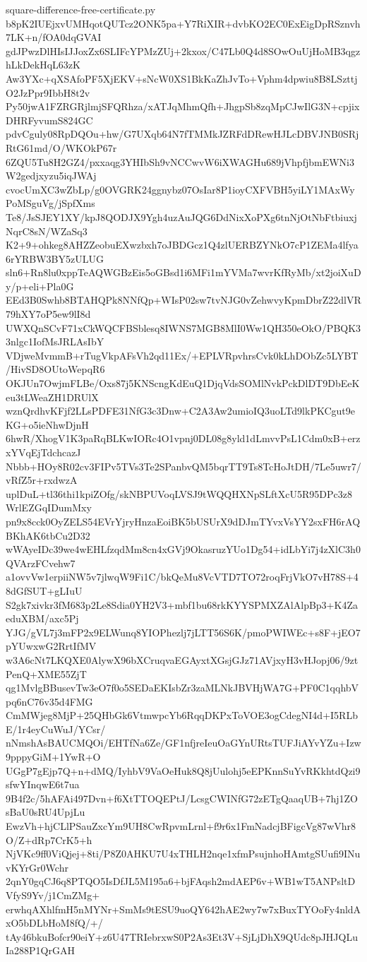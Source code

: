 \documentclass[11pt]{article}
\theoremstyle{definition}
\theoremstyle{remark}
\begin{document}
\begin{filecontents*}[overwrite]{square-difference-free-certificate.py}
b8pK2IUEjxvUMHqotQUTcz2ONK5pa+Y7RiXIR+dvbKO2EC0ExEigDpRSznvh7LK+n/fOA0dqGVAI
gdJPwzDlHIsIJJoxZx6SLIFcYPMzZUj+2kxox/C47Lb0Q4d8SOwOuUjHoMB3qgzhLkDekHqL63zK
Aw3YXc+qXSAfoPF5XjEKV+sNcW0XS1BkKaZhJvTo+Vphm4dpwiu8B8LSzttjO2JzPpr9IbbH8t2v
Py50jwA1FZRGRjlmjSFQRhza/xATJqMhmQfh+JhgpSb8zqMpCJwIlG3N+cpjixDHRFyvumS824GC
pdvCguly08RpDQOu+hw/G7UXqb64N7fTMMkJZRFdDRewHJLcDBVJNB0SRjRtG61md/O/WKOkP67r
6ZQU5Tu8H2GZ4/pxxaqg3YHIbSh9vNCCwvW6iXWAGHu689jVhpfjbmEWNi3W2gedjxyzu5iqJWAj
cvocUmXC3wZbLp/g0OVGRK24ggnybz07OsIar8P1ioyCXFVBH5yiLY1MAxWyPoMSguVg/jSpfXms
Te8/JsSJEY1XY/kpJ8QODJX9Ygh4uzAuJQG6DdNixXoPXg6tnNjOtNbFtbiuxjNqrC8sN/WZaSq3
K2+9+ohkeg8AHZZeobuEXwzbxh7oJBDGcz1Q4zlUERBZYNkO7cP1ZEMa4lfya6rYRBW3BY5zULUG
sln6+Rn8lu0xppTeAQWGBzEis5oGBsd1i6MFi1mYVMa7wvrKfRyMb/xt2joiXuDy/p+eli+Pla0G
EEd3B0Swhb8BTAHQPk8NNfQp+WIsP02sw7tvNJG0vZehwvyKpmDbrZ22dlVR79hXY7oP5ew9lI8d
UWXQnSCvF71xCkWQCFBSblesq8IWNS7MGB8MlI0Ww1QH350eOkO/PBQK33nlgc1IofMsJRLAsIbY
VDjweMvmmB+rTugVkpAFsVh2qd11Ex/+EPLVRpvhrsCvk0kLhDObZc5LYBT/HivSD8OUtoWepqR6
OKJUn7OwjmFLBe/Oxs87j5KNScngKdEuQ1DjqVdsSOMlNvkPckDlDT9DbEeKeu3tLWeaZH1DRUlX
wznQrdhvKFjf2LLsPDFE31NfG3c3Dnw+C2A3Aw2umioIQ3uoLTd9lkPKCgut9eKG+o5ieNhwDjnH
6hwR/XhogV1K3paRqBLKwIORc4O1vpnj0DL08g8yld1dLmvvPsL1Cdm0xB+erzxYVqEjTdchcazJ
Nbbb+HOy8R02cv3FIPv5TVs3Te2SPanbvQM5bqrTT9Ts8TcHoJtDH/7Le5uwr7/vRfZ5r+rxdwzA
uplDuL+tl36thi1kpiZOfg/skNBPUVoqLVSJ9tWQQHXNpSLftXcU5R95DPc3z8WrlEZGqIDumMxy
pn9x8cck0OyZELS54EVrYjryHnzaEoiBK5bUSUrX9dDJmTYvxVsYY2sxFH6rAQBKhAK6tbCu2D32
wWAyeIDc39we4wEHLfzqdMm8cn4xGVj9OkasruzYUo1Dg54+idLbYi7j4zXlC3h0QVArzFCvehw7
a1ovvVw1erpiiNW5v7jlwqW9Fi1C/bkQeMu8VcVTD7TO72roqFrjVkO7vH78S+48dGfSUT+gLIuU
S2gk7xivkr3fM683p2Le8Sdia0YH2V3+mbf1bu68rkKYYSPMXZAlAlpBp3+K4ZaeduXBM/axc5Pj
YJG/gVL7j3mFP2x9ELWunq8YIOPhezlj7jLTT56S6K/pmoPWIWEc+s8F+jEO7pYUwxwG2RrtIfMV
w3A6cNt7LKQXE0AlywX96bXCruqvaEGAyxtXGsjGJz71AVjxyH3vHJopj06/9ztPenQ+XME55ZjT
qg1MvlgBBusevTw3eO7f0o5SEDaEKIsbZr3zaMLNkJBVHjWA7G+PF0C1qqhbVpq6nC76v35d4FMG
CmMWjeg8MjP+25QHbGk6VtmwpcYb6RqqDKPxToVOE3ogCdegNI4d+I5RLbE/1r4eyCuWuJ/YCsr/
nNmshAsBAUCMQOi/EHTfNa6Ze/GF1nfjreIeuOaGYnURtsTUFJiAYvYZu+Izw9pppyGiM+1YwR+O
UGgP7gEjp7Q+n+dMQ/IyhbV9VaOeHuk8Q8jUulohj5eEPKnnSuYvRKkhtdQzi9sfwYInqwE6t7ua
9B4f2c/5hAFAi497Dvn+f6XtTTOQEPtJ/LcsgCWINfG72zETgQaaqUB+7hj1ZOsBaU0sRU4UpjLu
EwzVh+hjCLlPSauZxcYm9UH8CwRpvmLrnl+f9r6x1FmNadcjBFigcVg87wVhr8O/Z+dRp7CrK5+h
NjVKc9ff0ViQjej+8ti/P8Z0AHKU7U4xTHLH2nqe1xfmPsujnhoHAmtgSUufi9INuvKYrGr0Wchr
2qnY0gqCJ6q8PTQO5IsDfJL5M195a6+bjFAqsh2mdAEP6v+WB1wT5ANPsltDVfyS9Yv/j1CmZMg+
erwhqAXhlfmH5nMYNr+SmMs9tESU9uoQY642hAE2wy7w7xBuxTYOoFy4nldAxO5bDLbHoM8fQ/+/
tAy46bkuBofcr90eiY+z6U47TRIebrxwS0P2As3Et3V+SjLjDhX9QUdc8pJHJQLuIa288P1QrGAH

\end{filecontents*}
\end{document}
